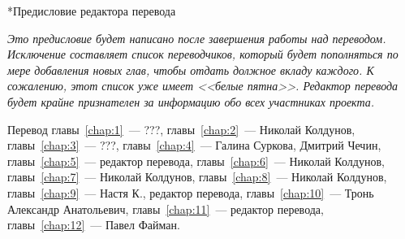 
\begin{chapter}*{Предисловие редактора перевода}

\textit{Это предисловие будет написано после завершения работы над переводом.
Исключение составляет список переводчиков, который будет пополняться
по мере добавления новых глав, чтобы отдать должное вкладу каждого.
К сожалению, этот список уже имеет <<белые пятна>>. Редактор
перевода будет крайне признателен за информацию обо всех участниках проекта.}

\bigskip 

Перевод главы~\ref{chap:1}~--- ???, главы~\ref{chap:2}~--- Николай Колдунов,
главы~\ref{chap:3}~--- ???, главы~\ref{chap:4}~--- Галина Суркова, 
Дмитрий Чечин, главы~\ref{chap:5}~--- редактор перевода, 
главы~\ref{chap:6}~--- Николай Колдунов, 
главы~\ref{chap:7}~--- Николай Колдунов,
главы~\ref{chap:8}~--- Николай Колдунов,
главы~\ref{chap:9}~--- Настя К., редактор перевода,
главы~\ref{chap:10}~--- Тронь Александр Анатольевич,
главы~\ref{chap:11}~--- редактор перевода,
главы~\ref{chap:12}~--- Павел Файман.
\end{chapter}